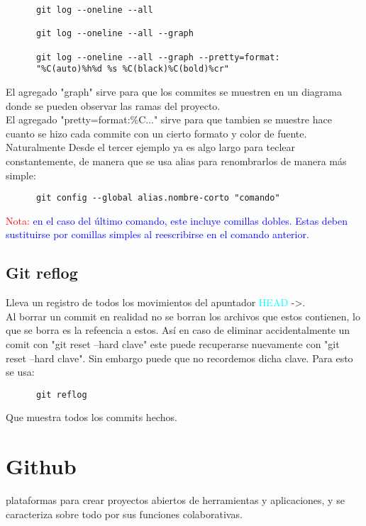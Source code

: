 \documentclass[10pt,oneside]{article}
\begin{document}
\begin{multicols}{2}
\begin{verbatim}
      git log --oneline --all
      
      git log --oneline --all --graph 
      
      git log --oneline --all --graph --pretty=format:
      "%C(auto)%h%d %s %C(black)%C(bold)%cr"
  \end{verbatim}
  El agregado "graph" sirve para que los commites se muestren en un diagrama donde se pueden observar las ramas del proyecto. \\\newline
  El agregado "pretty=format:\%C..." sirve para que tambien se muestre hace cuanto se hizo cada commite con un cierto formato y color de fuente.\\ \newline
  Naturalmente Desde el tercer ejemplo ya es algo largo para teclear constantemente, de manera que se usa alias para renombrarlos de manera más simple: \begin{verbatim}
      git config --global alias.nombre-corto "comando"
  \end{verbatim}
  \textcolor{red}{Nota: } \textcolor{blue}{en el caso del último comando, este incluye comillas dobles. Estas deben sustituirse por comillas simples al reescribirse en el comando anterior.}
  \subsection{Git reflog} Lleva un registro de todos los movimientos del apuntador \textcolor{cyan}{HEAD} ->. \\\newline Al borrar un commit en realidad no se borran los archivos que estos contienen, lo que se borra es la refeencia a estos. Así en caso de eliminar accidentalmente un comit con "git reset --hard clave" este puede recuperarse nuevamente con "git reset --hard clave". Sin embargo puede que no recordemos dicha clave. Para esto se usa:\begin{verbatim}
      git reflog
  \end{verbatim}
  Que muestra todos los commits hechos.
  \section{Github}
  plataformas para crear proyectos abiertos de herramientas y aplicaciones, y se caracteriza sobre todo por sus funciones colaborativas.

\end{multicols}
\end{document}
